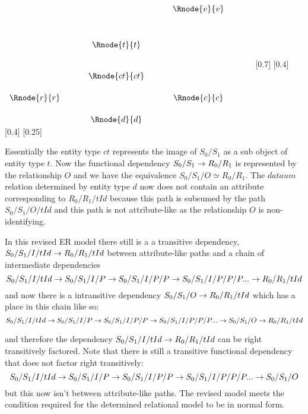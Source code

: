 $
\begin{array}{cp{0.5cm}cp{0.5cm}cp{0.3cm}c}
            &&                && \Rnode{v}{v} &&              \\[1.1cm]
            && \Rnode{t}{t}   &&              &&              \\[0.9cm] 
						&& \Rnode{ct}{ct} &&              &&              \\[0.5cm] 
\Rnode{r}{r}&&                && \Rnode{c}{c} &&              \\[0.5cm]
	          && \Rnode{d}{d}   &&              &&               
\end{array}
$
[0.7]
[0.4]
\idcomp
{}
[0.4]
\idcomp
{} 
\idcomp
{} 
\idcomp
{}
\idcomp
{}
\idcomp
{}
\idcomp
[0.25]
\idcomp

Essentially the entity type $ct$ represents the image of $S_0/S_1$
as a sub object of entity type $t$. Now the functional dependency
$S_0/S_1 \rightarrow R_0/{R_1}$ is represented by the relationship $O$
and we have the equivalence $S_0/S_1/O \simeq R_0/R_1$. The $dataum$
relation determined by entity type $d$ now does not contain an attribute
corresponding to $R_0/R_1/tId$ because this path is subsumed by the path
$S_0/S_1/O/tId$ and this path is not attribute-like
as the relationship $O$ is non-identifying. 

In this revised ER model there still is a 
a transitive dependency, $S_0/S_1/I/tId \rightarrow R_0/R_1/tId$ between attribute-like paths 
and a chain of intermediate dependencies 
\begin{equation}
S_0/S_1/I/tId \rightarrow S_0/S_1/I/P \rightarrow S_0/S_1/I/P/P \rightarrow S_0/S_1/I/P/P/P  ... \rightarrow R_0/R_1/tId
\end{equation}
and now there is a intransitive dependency $S_0/S_1/O \rightarrow R_0/R_1/tId$ which has a place in this chain like so:
\begin{equation}
S_0/S_1/I/tId \rightarrow S_0/S_1/I/P \rightarrow S_0/S_1/I/P/P \rightarrow S_0/S_1/I/P/P/P  ... \rightarrow S_0/S_1/O \rightarrow R_0/R_1/tId
\end{equation}

and therefore the dependency $S_0/S_1/I/tId \rightarrow R_0/R_1/tId$ can be right transitively factored.
Note that there is still a transitive functional dependency that does not factor right transitively:
\begin{equation}
S_0/S_1/I/tId \rightarrow S_0/S_1/I/P \rightarrow S_0/S_1/I/P/P \rightarrow S_0/S_1/I/P/P/P  ... \rightarrow S_0/S_1/O
\end{equation}
 but this now isn't between attribute-like paths. The revised model meets the condition required for the determined relational model to be in normal form.


